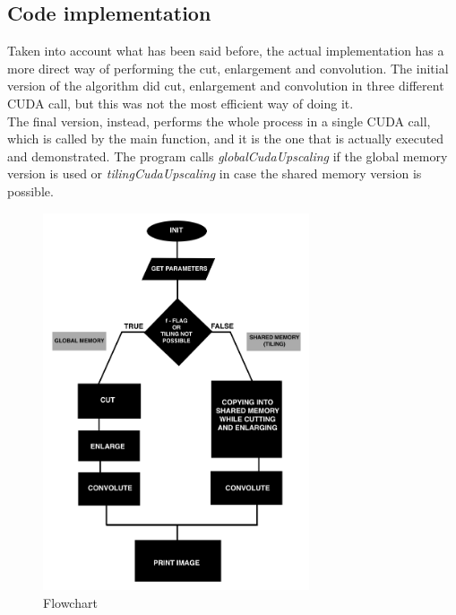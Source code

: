     \subsection{Code implementation}
    Taken into account what has been said before, the actual implementation has a more direct way of performing the cut, enlargement and convolution.
    The initial version of the algorithm did cut, enlargement and convolution in three different CUDA call, but this was not the most efficient way of doing it.\\
    The final version, instead, performs the whole process in a single CUDA call, which is called by the main function, and it is the one that is actually executed and demonstrated.
    The program calls \textit{globalCudaUpscaling} if the global memory version is used or \textit{tilingCudaUpscaling} in case the shared memory version is possible.

    \begin{figure}[h]
        \centering
        \includegraphics[width=0.7\textwidth]{img/flowchart.png}
        \caption{Flowchart}
        \label{fig:flowchart}
    \end{figure}